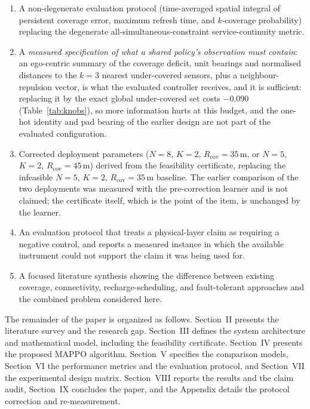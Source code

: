 \documentclass[conference]{IEEEtran}
\begin{document}
\begin{enumerate}
    \item A non-degenerate evaluation protocol (time-averaged spatial integral of persistent coverage error, maximum refresh time, and $k$-coverage probability) replacing the degenerate all-simultaneous-constraint service-continuity metric.
    \item A \emph{measured specification of what a shared policy's observation must contain}: an ego-centric summary of the coverage deficit, unit bearings and normalised distances to the $k=3$ nearest under-covered sensors, plus a neighbour-repulsion vector, is what the evaluated controller receives, and it is sufficient: replacing it by the exact global under-covered set costs $-0.090$ (Table~\ref{tab:knobs}), so more information hurts at this budget, and the one-hot identity and pad bearing of the earlier design are not part of the evaluated configuration.
    \item Corrected deployment parameters ($N=8$, $K=2$, $R_{\mathrm{cov}}=35\,\mathrm{m}$, or $N=5$, $K=2$, $R_{\mathrm{cov}}=45\,\mathrm{m}$) derived from the feasibility certificate, replacing the infeasible $N=5$, $K=2$, $R_{\mathrm{cov}}=35\,\mathrm{m}$ baseline.  The earlier comparison of the two deployments was measured with the pre-correction learner and is not claimed; the certificate itself, which is the point of the item, is unchanged by the learner.
    \item An evaluation protocol that treats a physical-layer claim as requiring a negative control, and reports a measured instance in which the available instrument could not support the claim it was being used for.
    \item A focused literature synthesis showing the difference between existing coverage, connectivity, recharge-scheduling, and fault-tolerant approaches and the combined problem considered here.
\end{enumerate}

The remainder of the paper is organized as follows. Section~II presents the literature survey and the research gap. Section~III defines the system architecture and mathematical model, including the feasibility certificate. Section~IV presents the proposed MAPPO algorithm. Section~V specifies the comparison models, Section~VI the performance metrics and the evaluation protocol, and Section~VII the experimental design matrix. Section~VIII reports the results and the claim audit, Section~IX concludes the paper, and the Appendix details the protocol correction and re-measurement.
\end{document}
